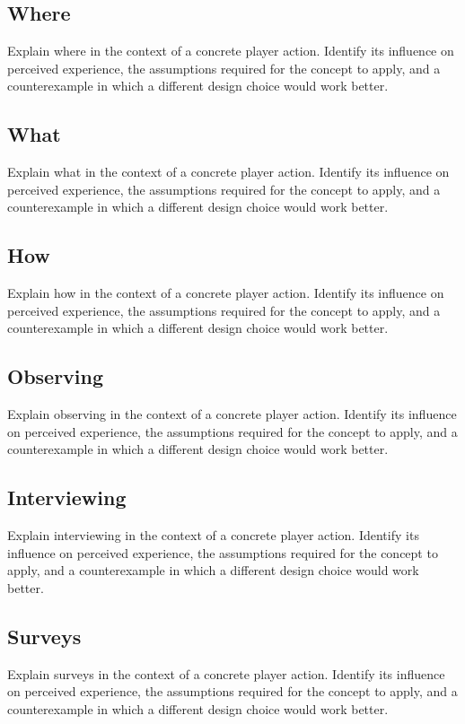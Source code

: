 \documentclass[11pt]{article}
\begin{document}
\subsection{Where}
Explain where in the context of a concrete player action. Identify its influence on perceived experience, the assumptions required for the concept to apply, and a counterexample in which a different design choice would work better.


\subsection{What}
Explain what in the context of a concrete player action. Identify its influence on perceived experience, the assumptions required for the concept to apply, and a counterexample in which a different design choice would work better.


\subsection{How}
Explain how in the context of a concrete player action. Identify its influence on perceived experience, the assumptions required for the concept to apply, and a counterexample in which a different design choice would work better.


\subsection{Observing}
Explain observing in the context of a concrete player action. Identify its influence on perceived experience, the assumptions required for the concept to apply, and a counterexample in which a different design choice would work better.


\subsection{Interviewing}
Explain interviewing in the context of a concrete player action. Identify its influence on perceived experience, the assumptions required for the concept to apply, and a counterexample in which a different design choice would work better.


\subsection{Surveys}
Explain surveys in the context of a concrete player action. Identify its influence on perceived experience, the assumptions required for the concept to apply, and a counterexample in which a different design choice would work better.
\end{document}
